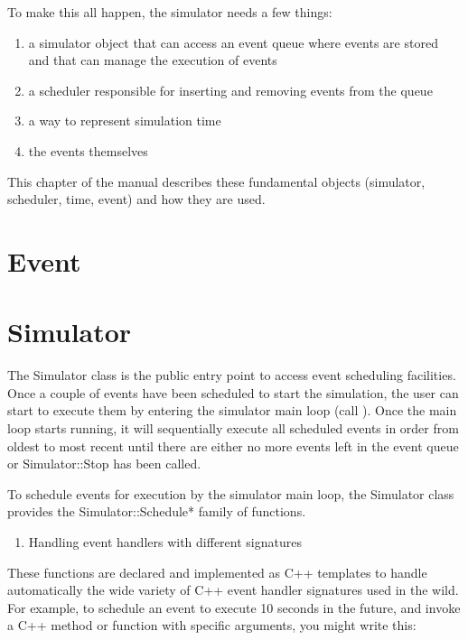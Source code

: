 \documentclass[letterpaper,10pt,english]{sphinxmanual}
\renewcommand{\sphinxcode}[1]{\texttt{\small{#1}}}
\begin{document}
To make this all happen, the simulator needs a few things:
\begin{enumerate}
%
\item {} 
a simulator object that can access an event queue where events are
stored and that can manage the execution of events

\item {} 
a scheduler responsible for inserting and removing events from the queue

\item {} 
a way to represent simulation time

\item {} 
the events themselves

\end{enumerate}

This chapter of the manual describes these fundamental objects
(simulator, scheduler, time, event) and how they are used.


\section{Event}
\label{\detokenize{events:event}}


\section{Simulator}
\label{\detokenize{events:simulator}}
The Simulator class is the public entry point to access event scheduling
facilities. Once a couple of events have been scheduled to start the
simulation, the user can start to execute them by entering the simulator
main loop (call \sphinxcode{}). Once the main loop starts running, it
will sequentially execute all scheduled events in order from oldest to
most recent until there are either no more events left in the event
queue or Simulator::Stop has been called.

To schedule events for execution by the simulator main loop, the
Simulator class provides the Simulator::Schedule* family of functions.
\begin{enumerate}
%
\item {} 
Handling event handlers with different signatures

\end{enumerate}

These functions are declared and implemented as C++ templates to handle
automatically the wide variety of C++ event handler signatures used in
the wild. For example, to schedule an event to execute 10 seconds in the
future, and invoke a C++ method or function with specific arguments, you
might write this:
\end{document}
